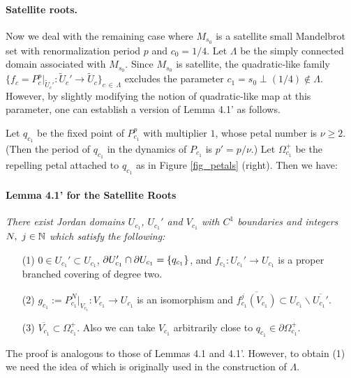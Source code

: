 \paragraph{\bf Satellite roots.}
Now we deal with the remaining case 
where $M_{s_0}$ is a satellite small Mandelbrot set 
with renormalization period $p$ and $c_0 =1/4$. 
Let $\Lambda$ be the simply connected domain associated with $M_{s_0}$. 
Since $M_{s_0}$ is satellite, 
the quadratic-like family 
$
\{ 
f_c = P_c^p|_{\widetilde{U}_c'} : \widetilde{U}_c' \to \widetilde{U}_c
\}_{c \, \in \,\Lambda}
$
excludes the parameter $c_1 =s_0 \perp (1/4) \notin \Lambda$.
However, by slightly modifying the notion of quadratic-like map 
at this parameter,
one can establish a version of Lemma 4.1' as follows.


Let $q_{c_1}$ be the fixed point of $P_{c_1}^{p}$ with multiplier $1$, 
whose petal number is $\nu \ge 2$. 
(Then the period of $q_{c_1}$ in the dynamics of $P_{c_1}$ 
is $p'=p/\nu$.)
Let $\Omega_{c_1}^+$ be the repelling petal attached to $q_{c_1}$ as in Figure \ref{fig_petals} (right). 
Then we have:

\paragraph{\bf Lemma 4.1' for the Satellite Roots} 
{\it 
There exist Jordan domains $U_{c_1}$, $U_{c_1}'$ and $V_{c_1}$ with 
$C^1$ boundaries and 
integers $N, \ j \in \mathbb N$ which satisfy 
the following:
\begin{itemize}
\item[\rm (1)]
$0 \in {U}_{c_1}' \subset {U}_{c_1}$,
$\partial {U}_{c_1}' \cap \partial {U}_{c_1}={\left\{ q_{c_1} \right\}}$,
and $f_{c_1}:{U}_{c_1}' \to {U}_{c_1}$
is a proper branched covering of degree two.
\item[\rm (2)]
$g_{c_1} := P_{c_1}^N|_{V_{c_1}} : V_{c_1} \to U_{c_1}$ is an isomorphism
and $\overline{f_{c_1}^j(V_{c_1})} 
\subset U_{c_1} \smallsetminus \overline{U_{c_1}'}$.
\item[\rm (3)]
$\overline{V_{c_1}} \subset \Omega_{c_1}^+$. Also we can take $V_{c_1}$ arbitrarily
close to $q_{c_1} \in \partial \Omega_{c_1}^+$.
\end{itemize}
}
The proof is analogous to those of Lemmas 4.1 and 4.1'. 
However, to obtain (1) we need the idea of \cite[\S 3]{Haissinsky 2000} 
which is originally used in the construction of $\Lambda$.

